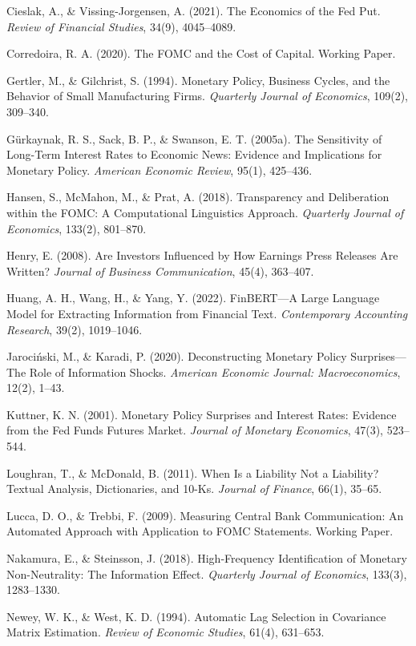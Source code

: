 \documentclass[
]{article}
\begin{document}
Cieslak, A., \& Vissing-Jorgensen, A. (2021). The Economics of the Fed
Put. \emph{Review of Financial Studies}, 34(9), 4045--4089.

Corredoira, R. A. (2020). The FOMC and the Cost of Capital. Working
Paper.

Gertler, M., \& Gilchrist, S. (1994). Monetary Policy, Business Cycles,
and the Behavior of Small Manufacturing Firms. \emph{Quarterly Journal
of Economics}, 109(2), 309--340.

Gürkaynak, R. S., Sack, B. P., \& Swanson, E. T. (2005a). The
Sensitivity of Long-Term Interest Rates to Economic News: Evidence and
Implications for Monetary Policy. \emph{American Economic Review},
95(1), 425--436.

Hansen, S., McMahon, M., \& Prat, A. (2018). Transparency and
Deliberation within the FOMC: A Computational Linguistics Approach.
\emph{Quarterly Journal of Economics}, 133(2), 801--870.

Henry, E. (2008). Are Investors Influenced by How Earnings Press
Releases Are Written? \emph{Journal of Business Communication}, 45(4),
363--407.

Huang, A. H., Wang, H., \& Yang, Y. (2022). FinBERT---A Large Language
Model for Extracting Information from Financial Text. \emph{Contemporary
Accounting Research}, 39(2), 1019--1046.

Jarociński, M., \& Karadi, P. (2020). Deconstructing Monetary Policy
Surprises---The Role of Information Shocks. \emph{American Economic
Journal: Macroeconomics}, 12(2), 1--43.

Kuttner, K. N. (2001). Monetary Policy Surprises and Interest Rates:
Evidence from the Fed Funds Futures Market. \emph{Journal of Monetary
Economics}, 47(3), 523--544.

Loughran, T., \& McDonald, B. (2011). When Is a Liability Not a
Liability? Textual Analysis, Dictionaries, and 10-Ks. \emph{Journal of
Finance}, 66(1), 35--65.

Lucca, D. O., \& Trebbi, F. (2009). Measuring Central Bank
Communication: An Automated Approach with Application to FOMC
Statements. Working Paper.

Nakamura, E., \& Steinsson, J. (2018). High-Frequency Identification of
Monetary Non-Neutrality: The Information Effect. \emph{Quarterly Journal
of Economics}, 133(3), 1283--1330.

Newey, W. K., \& West, K. D. (1994). Automatic Lag Selection in
Covariance Matrix Estimation. \emph{Review of Economic Studies}, 61(4),
631--653.
\end{document}
